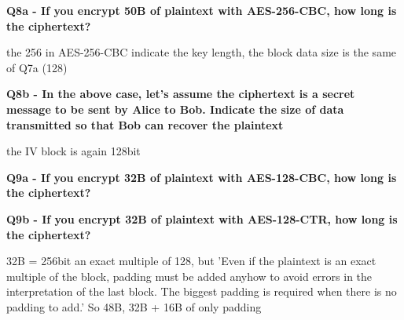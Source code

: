 \textbf{Q8a - If you encrypt 50B of plaintext with AES-256-CBC, how long is the ciphertext?}
\textcolor{Comment}{the 256 in AES-256-CBC indicate the key length, the block data size is the same of Q7a (128)}


\textbf{Q8b - In the above case, let’s assume the ciphertext is a secret message to be sent by Alice to Bob. Indicate the size of data transmitted so that Bob can recover the plaintext}
\textcolor{Comment}{the IV block is again 128bit}

\textbf{Q9a - If you encrypt 32B of plaintext with AES-128-CBC, how long is the ciphertext?}

\textbf{Q9b - If you encrypt 32B of plaintext with AES-128-CTR, how long is the ciphertext?}
\textcolor{Comment}{32B = 256bit an exact multiple of 128, but 'Even if the plaintext is an exact multiple of the block, padding must be added anyhow to avoid
errors in the interpretation of the last block. The biggest padding is required when there is no padding to add.' So 48B, 32B + 16B of only padding }

